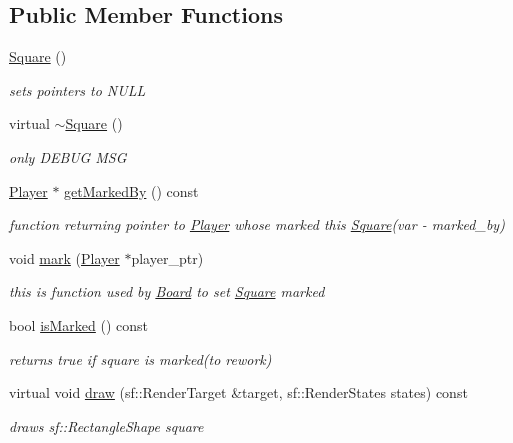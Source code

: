 \subsection*{Public Member Functions}
\begin{DoxyCompactItemize}
\item 
\hyperlink{class_square_a3dc7ff9aefc2725172b5d3153973d243}{Square} ()
\begin{DoxyCompactList}\small\item\em sets pointers to N\+U\+L\+L \end{DoxyCompactList}\item 
virtual \hyperlink{class_square_a90af7ce1060cff7b717ceddb333846b8}{$\sim$\+Square} ()
\begin{DoxyCompactList}\small\item\em only D\+E\+B\+U\+G M\+S\+G \end{DoxyCompactList}\item 
\hyperlink{class_player}{Player} $\ast$ \hyperlink{class_square_ab67268190c292712504e4a6039781423}{get\+Marked\+By} () const 
\begin{DoxyCompactList}\small\item\em function returning pointer to \hyperlink{class_player}{Player} whose marked this \hyperlink{class_square}{Square}(var -\/ marked\+\_\+by) \end{DoxyCompactList}\item 
void \hyperlink{class_square_ab425c2f7271014c9d01eff4b0e053b31}{mark} (\hyperlink{class_player}{Player} $\ast$player\+\_\+ptr)
\begin{DoxyCompactList}\small\item\em this is function used by \hyperlink{class_board}{Board} to set \hyperlink{class_square}{Square} marked \end{DoxyCompactList}\item 
bool \hyperlink{class_square_a0b6ff04d5e7f6349889e989c6c187672}{is\+Marked} () const 
\begin{DoxyCompactList}\small\item\em returns true if square is marked(to rework) \end{DoxyCompactList}\item 
virtual void \hyperlink{class_square_a343e5c679cacddf7250f363875518bf9}{draw} (sf\+::\+Render\+Target \&target, sf\+::\+Render\+States states) const 
\begin{DoxyCompactList}\small\item\em draws sf\+::\+Rectangle\+Shape square \end{DoxyCompactList}\end{DoxyCompactItemize}
